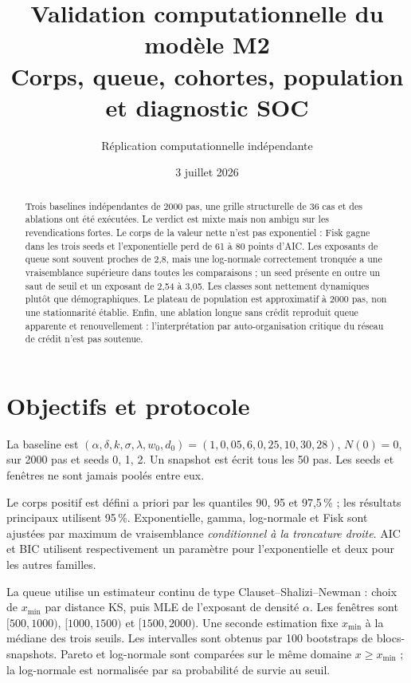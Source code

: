 \documentclass[11pt,a4paper]{article}
\title{Validation computationnelle du modèle M2\\
\large Corps, queue, cohortes, population et diagnostic SOC}
\author{Réplication computationnelle indépendante}
\date{3 juillet 2026}
\begin{document}
\maketitle

\begin{abstract}
Trois baselines indépendantes de 2000 pas, une grille structurelle de 36 cas et
des ablations ont été exécutées. Le verdict est mixte mais non ambigu sur les
revendications fortes. Le corps de la valeur nette n'est pas exponentiel : Fisk
gagne dans les trois seeds et l'exponentielle perd de 61 à 80 points d'AIC. Les
exposants de queue sont souvent proches de 2,8, mais une log-normale correctement
tronquée a une vraisemblance supérieure dans toutes les comparaisons ; un seed
présente en outre un saut de seuil et un exposant de 2,54 à 3,05. Les classes sont
nettement dynamiques plutôt que démographiques. Le plateau de population est
approximatif à 2000 pas, non une stationnarité établie. Enfin, une ablation longue
sans crédit reproduit queue apparente et renouvellement : l'interprétation par
auto-organisation critique du réseau de crédit n'est pas soutenue.
\end{abstract}

\tableofcontents

\section{Objectifs et protocole}

La baseline est
$(\alpha,\delta,k,\sigma,\lambda,w_0,d_0)=(1,0{,}05,6,0{,}25,10,30,28)$,
$N(0)=0$, sur 2000 pas et seeds 0, 1, 2. Un snapshot est écrit tous les 50 pas.
Les seeds et fenêtres ne sont jamais poolés entre eux.

Le corps positif est défini a priori par les quantiles 90, 95 et 97,5\,\% ; les
résultats principaux utilisent 95\,\%. Exponentielle, gamma, log-normale et Fisk
sont ajustées par maximum de vraisemblance \emph{conditionnel à la troncature
droite}. AIC et BIC utilisent respectivement un paramètre pour l'exponentielle et
deux pour les autres familles.

La queue utilise un estimateur continu de type Clauset--Shalizi--Newman : choix
de $x_{\min}$ par distance KS, puis MLE de l'exposant de densité $\alpha$. Les
fenêtres sont $[500,1000)$, $[1000,1500)$ et $[1500,2000)$. Une seconde estimation
fixe $x_{\min}$ à la médiane des trois seuils. Les intervalles sont obtenus par
100 bootstraps de blocs-snapshots. Pareto et log-normale sont comparées sur le
même domaine $x\geq x_{\min}$ ; la log-normale est normalisée par sa probabilité
de survie au seuil.
\end{document}
